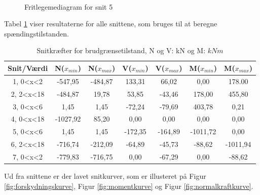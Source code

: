 \begin{figure}[H]
\begin{minipage}[b]{0.48\textwidth}
	\end{minipage}\\ %
	\begin{minipage}[t]{0.48\textwidth}
		\caption{Fritlegemediagram for snit 1} %
		\label{fig:snitet}
	\end{minipage}\hfill
	\begin{minipage}[t]{0.48\textwidth}
		\caption{Fritlegemediagram for snit 5} %
		\label{fig:snitfem}
	\end{minipage}
\end{figure}

Tabel \ref{tab:resultaterbrud} viser resultaterne for alle snittene, som bruges til at beregne spændingstilstanden. 

\begin{table}
	\begin{center}
		\begin{tabular}{|c|c|c|c|c|c|c|}
			\hline
			Snit/Værdi & N($x_{min}$) & N($x_{max}$) & V($x_{min}$) & V($x_{max}$) & M($x_{min}$) & M($x_{max}$) 	\\ \hline
			1, 0<x<2  & -547,95       & -484,87    	&  133,31    	&  66,02 	&  0,00     &  178.00        		\\ \hline
			2, 2<x<18 &  -484,87        &  19,78       &  53,85      & -43,46   &  178,00  &  455,80    \\ \hline
			3, 0<x<6  & 1,45       &  1,45     &  -72,24         &  -79,69     &  403,78     &  0,21 			    \\ \hline
			4, 0<x<18 &  -1027,92       &  85,20      &  0,00        &  0,00    &  0,00   &   0,00    \\ \hline
			5, 0<x<6  &  1,45     &    1,45      &  -172,35      &  -164,89     &   -1011,72        &   0,00      		\\ \hline
			6, 2<x<18 &  -716,74  &   -212,09  &   -64,89    &   -45,73    &    -88,62       &   -1011,94      		\\ \hline
			7, 0<x<2 &  -779,83        &   -716,75       &     0,00      &   -67,29   &    0,00     &    -88,62     		\\ \hline
		\end{tabular}
		\caption{Snitkræfter for brudgrænsetilstand, N og V: kN og M: $kNm$}
		\label{tab:resultaterbrud}
	\end{center}
\end{table}

Ud fra snittene er der lavet snitkurver, som er illusteret på Figur \ref{fig:forskydningskurve}, Figur \ref{fig:momentkurve} og Figur \ref{fig:normalkraftkurve}. 

